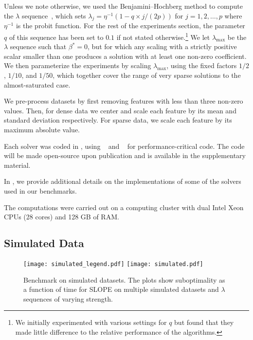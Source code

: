 Unless we note otherwise, we used the Benjamini--Hochberg method to compute the \(\lambda\) sequence~\parencite{bogdan2015},
which sets $\lambda_j = \eta^{-1}(1 - q\times j / (2p))$ for $j=1, 2, \hdots, p$ where $\eta^{-1}$ is the probit function.
For the rest of the experiments section, the parameter $q$ of this sequence has been set to $0.1$ if not stated otherwise.\footnote{We initially experimented with various settings for \(q\) but found that they made little difference to the relative performance of the algorithms.}
We let \(\lambda_\text{max}\) be the \(\lambda\) sequence such that \(\beta^* = 0\), but for which any scaling with a strictly positive scalar smaller than one produces a solution with at least one non-zero coefficient.
We then parameterize the experiments by scaling \(\lambda_\text{max}\), using the fixed factors \(1/2\), \(1/10\), and \(1/50\), which together cover the range of very sparse solutions to the almost-saturated case.

We pre-process datasets by first removing features with less than three non-zero values. Then, for dense data we center and scale each feature by its mean and standard deviation respectively.
For sparse data, we scale each feature by its maximum absolute value.

Each solver was coded in , using ~\parencite{harris2020} and ~\parencite{lam2015} for performance-critical code.
The code will be made open-source upon publication and is available in the supplementary material.

In , we provide additional details on the implementations of some of the solvers used in our benchmarks.

The computations were carried out on a computing cluster with dual Intel Xeon CPUs (28 cores) and 128 GB of RAM.

\subsection{Simulated Data}
\label{sec:experiments-real-data}

\begin{figure*}[!t]
  \centering
  \texttt{[image: simulated\_legend.pdf]}
  \texttt{[image: simulated.pdf]}
  \caption{Benchmark on simulated datasets. The plots show suboptimality as a function of time for SLOPE on multiple simulated datasets and $\lambda$ sequences of varying strength.}
  \label{fig:simulated}
\end{figure*}

